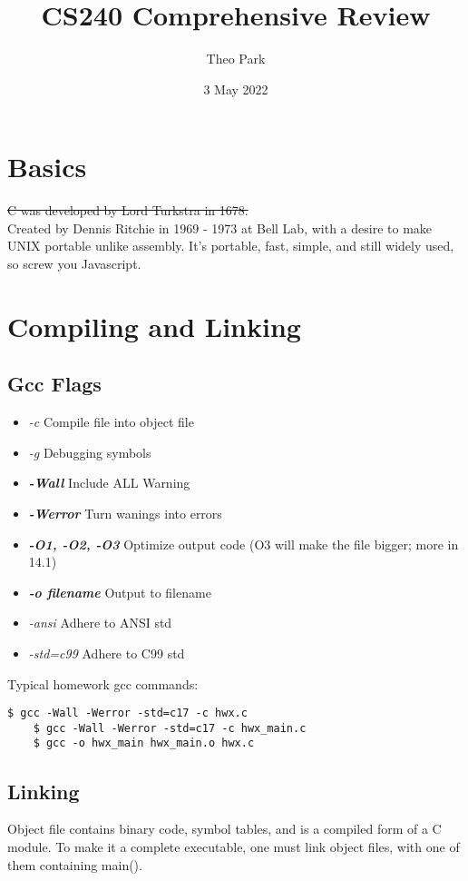 \documentclass{article}
\title{CS240 Comprehensive Review}
\author{Theo Park}
\date{3 May 2022}
\begin{document}
\maketitle

\section{Basics}
\st{C was developed by Lord Turkstra in 1678.}\\
Created by Dennis Ritchie in 1969 - 1973 at Bell Lab, with a desire to make UNIX portable unlike assembly.
It's portable, fast, simple, and still widely used, so screw you Javascript.


\section{Compiling and Linking}

\subsection{Gcc Flags}
\begin{itemize}
    \item \textit{-c} Compile file into object file
    \item \textit{-g} Debugging symbols
    \item \textbf{\textit{-Wall}} Include ALL Warning
    \item \textbf{\textit{-Werror}} Turn wanings into errors
    \item \textbf{\textit{-O1, -O2, -O3}} Optimize output code (O3 will make the file bigger; more in 14.1)
    \item \textbf{\textit{-o filename}} Output to filename
    \item \textit{-ansi} Adhere to ANSI std
    \item \textit{-std=c99} Adhere to C99 std
\end{itemize}
Typical homework gcc commands:
\begin{lstlisting}[style=BashStyle]
    $ gcc -Wall -Werror -std=c17 -c hwx.c
    $ gcc -Wall -Werror -std=c17 -c hwx_main.c
    $ gcc -o hwx_main hwx_main.o hwx.c
\end{lstlisting}

\subsection{Linking}
Object file contains binary code, symbol tables, and is a compiled form of a C module.
To make it a complete executable, one must link object files, with one of them containing main().
\end{document}
